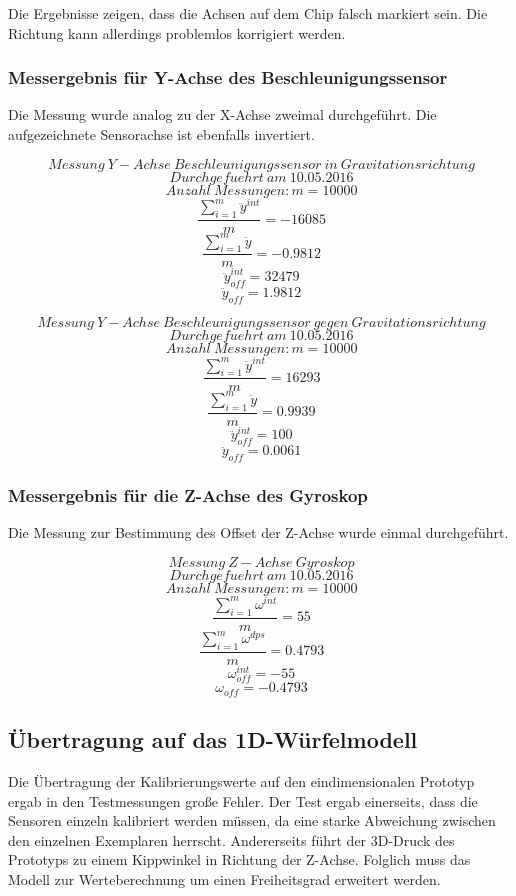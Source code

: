\documentclass{article}
\begin{document}
Die Ergebnisse zeigen, dass die Achsen auf dem Chip falsch markiert sein. Die Richtung kann allerdings problemlos korrigiert werden.

\subsubsection{Messergebnis für Y-Achse des Beschleunigungssensor}
Die Messung wurde analog zu der X-Achse zweimal durchgeführt. Die aufgezeichnete Sensorachse ist ebenfalls invertiert.

\[\ Messung \ Y-Achse \ Beschleunigungssensor \ in \ Gravitationsrichtung \]
\[\ Durchgefuehrt \ am \ 10.05.2016 \]
\[\ Anzahl \ Messungen : m = 10000 \]
\[\ \frac{\sum_{i = 1}^{m} \ddot{y}^{int}}{m} = -16085 \]
\[\ \frac{\sum_{i = 1}^{m} \ddot{y}}{m} = -0.9812 \]
\[\ \ddot{y}_{off}^{int} = 32479 \]
\[\ \ddot{y}_{off} = 1.9812 \]


\[\ Messung \ Y-Achse \ Beschleunigungssensor \ gegen \ Gravitationsrichtung \]
\[\ Durchgefuehrt \ am \ 10.05.2016 \]
\[\ Anzahl \ Messungen : m = 10000 \]
\[\ \frac{\sum_{i = 1}^{m} \ddot{y}^{int}}{m} = 16293 \]
\[\ \frac{\sum_{i = 1}^{m} \ddot{y}}{m} = 0.9939 \]
\[\ \ddot{y}_{off}^{int} = 100 \]
\[\ \ddot{y}_{off} = 0.0061 \]

\subsubsection{Messergebnis für die Z-Achse des Gyroskop}
Die Messung zur Bestimmung des Offset der Z-Achse wurde einmal durchgeführt.

\[\ Messung \ Z-Achse \ Gyroskop\]
\[\ Durchgefuehrt \ am \ 10.05.2016 \]
\[\ Anzahl \ Messungen : m = 10000 \]
\[\ \frac{\sum_{i = 1}^{m} {\omega}^{int}}{m} = 55 \]
\[\ \frac{\sum_{i = 1}^{m} {\omega}^{dps}}{m} = 0.4793 \]
\[\ {\omega}_{off}^{int} = -55 \]
\[\ {\omega}_{off} = -0.4793 \]

\subsection{Übertragung auf das 1D-Würfelmodell}
Die Übertragung der Kalibrierungswerte auf den eindimensionalen Prototyp ergab in den Testmessungen große Fehler. Der Test ergab einerseits, dass die Sensoren einzeln kalibriert werden müssen, da eine starke Abweichung zwischen den einzelnen Exemplaren herrscht. Andererseits führt der 3D-Druck des Prototyps zu einem Kippwinkel in Richtung der Z-Achse. Folglich muss das Modell zur Werteberechnung um einen Freiheitsgrad erweitert werden.
\end{document}
